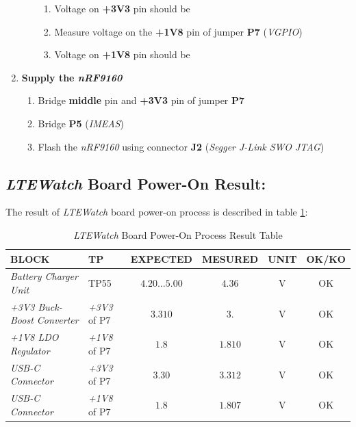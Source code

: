 \documentclass[Report.tex]{subfiles}
\begin{document}
\begin{enumerate}
\begin{enumerate}
\begin{enumerate}
\item Voltage on \textbf{+3V3} pin should be 
\item Measure voltage on the \textbf{+1V8} pin of jumper \textbf{P7} (\textit{VGPIO})
\item Voltage on \textbf{+1V8} pin should be 
\end{enumerate}
\end{enumerate}
\item \textbf{Supply the \textit{nRF9160}}
\begin{enumerate}
\item Bridge \textbf{middle} pin and \textbf{+3V3} pin of jumper \textbf{P7}
\item Bridge \textbf{P5} (\textit{IMEAS})
\item Flash the \textit{nRF9160} using connector \textbf{J2} (\textit{Segger J-Link SWO JTAG}) 
\end{enumerate}
\end{enumerate}

\subsection{\textit{LTEWatch} Board Power-On Result:}

The result of \textit{LTEWatch} board power-on process is described in table \ref{tab:poweron_tab}:

\begin{table}[H]
\centering
\begin{tabularx}{\textwidth}{|X|X|c|c|c|c|}
\hline
\textbf{BLOCK} & \textbf{TP} & \textbf{EXPECTED} & \textbf{MESURED} & \textbf{UNIT} & \textbf{OK/KO} \\\hline
\textit{Battery Charger Unit} & TP55 & $4.20\ldots 5.00$ & $4.36$ & \si{\volt} & \textcolor{mygreen}{OK}\\\hline
\textit{+3V3 Buck-Boost Converter} & \textit{+3V3} of P7 & $3.310$ & $3.$ & \si{\volt} & \textcolor{mygreen}{OK}\\\hline
\textit{+1V8 LDO Regulator} & \textit{+1V8} of P7 & $1.8$ & $1.810$ & \si{\volt} & \textcolor{mygreen}{OK}\\\hline
\textit{USB-C Connector} & \textit{+3V3} of P7 & $3.30$ & $3.312$ & \si{\volt} & \textcolor{mygreen}{OK}\\\hline
\textit{USB-C Connector} & \textit{+1V8} of P7& $1.8$ & $1.807 $ & \si{\volt} & \textcolor{mygreen}{OK}\\\hline
\end{tabularx}
\caption{\textit{LTEWatch} Board Power-On Process Result Table}
\label{tab:poweron_tab}
\end{table}
\end{document}
